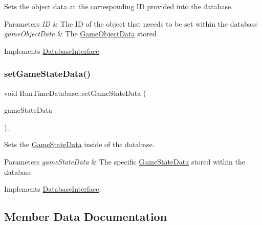 Sets the object data at the corresponding ID provided into the database. 


\begin{DoxyParams}{Parameters}
{\em ID} & The ID of the object that neeeds to be set within the database \\
\hline
{\em game\+Object\+Data} & The \hyperlink{struct_game_object_data}{Game\+Object\+Data} stored \\
\hline
\end{DoxyParams}


Implements \hyperlink{class_database_interface_ae1914371cb425f71ba750f57f968b491}{Database\+Interface}.

\mbox{\label{class_run_time_database_af18f09a5166adc6ab075034e272e9c8d}} 
\subsubsection{\texorpdfstring{set\+Game\+State\+Data()}{setGameStateData()}}
{\footnotesize\ttfamily void Run\+Time\+Database\+::set\+Game\+State\+Data (\begin{DoxyParamCaption}\item[{\hyperlink{struct_game_state_data}{Game\+State\+Data}}]{game\+State\+Data }\end{DoxyParamCaption})\hspace{0.3cm}{\ttfamily [override]}, {\ttfamily [virtual]}}



Sets the \hyperlink{struct_game_state_data}{Game\+State\+Data} inside of the database. 


\begin{DoxyParams}{Parameters}
{\em game\+State\+Data} & The specific \hyperlink{struct_game_state_data}{Game\+State\+Data} stored within the database \\
\hline
\end{DoxyParams}


Implements \hyperlink{class_database_interface_a0b2f4402583b6ab31c70c713d72ceede}{Database\+Interface}.



\subsection{Member Data Documentation}
\mbox{\label{class_run_time_database_aec15546ee0f7bf69bd1ba0a74656790d}} 
